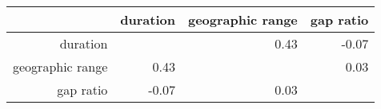 \begin{table}[ht]
\centering
\begin{tabular}{rrrr}
  \hline
 & duration & geographic range & gap ratio \\ 
  \hline
duration &  & 0.43 & -0.07 \\ 
  geographic range & 0.43 &  & 0.03 \\ 
  gap ratio & -0.07 & 0.03 &  \\ 
   \hline
\end{tabular}
\label{tab:pcor}
\end{table}
